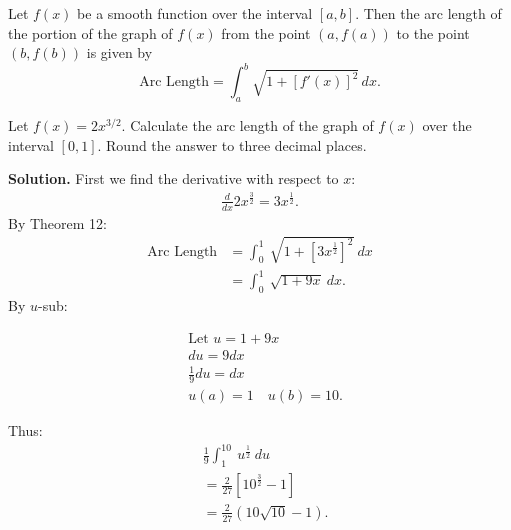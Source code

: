 \documentclass{report}
\begin{document}
    \bigbreak \noindent \bigbreak \noindent 
    \begin{thrm}[Arc length for $y=f(x)$]
        Let \(f(x)\) be a smooth function over the interval \([a,b]\). Then the arc length of the portion of the graph of \(f(x)\) from the point \((a,f(a))\) to the point \((b,f(b))\) is given by
        \[
        \text{Arc Length} = \int_a^b \sqrt{1 + [f'(x)]^2} \, dx.
        \]
    \end{thrm}
    \bigbreak \noindent \bigbreak \noindent 

    \pagebreak \bigbreak \noindent 
    \begin{eg}
        Let \( f(x) = 2x^{3/2} \). Calculate the arc length of the graph of \( f(x) \) over the interval \([0,1]\). Round the answer to three decimal places.
    \end{eg}
    \bigbreak \noindent 
    \textbf{Solution.} First we find the derivative with respect to $x$:
    \begin{align*}
        \frac{d}{dx}2x^{\frac{3}{2}} =3x^{\frac{1}{2}}
    .\end{align*}
    \bigbreak \noindent 
    By Theorem 12:
    \begin{align*}
        \text{Arc Length} &= \int_{0}^{1}\ \sqrt{1+[3x^{\frac{1}{2}}]^{2}}\ dx \\
          &=\int_{0}^{1}\ \sqrt{1+9x}\ dx 
    .\end{align*}
    \bigbreak \noindent 
    By $u$-sub:
    \bigbreak \noindent 
    \begin{minipage}[]{0.47\textwidth}
        \begin{align*}
            &\text{Let $u=1+9x$} \\
            &du = 9dx \\
            &\frac{1}{9}du = dx  \\
            &u(a) = 1 \quad u(b) = 10
        .\end{align*}
    \end{minipage}
    \begin{minipage}[]{0.47\textwidth}
        Thus:
        \begin{align*}
            &\frac{1}{9}\int_{1}^{10}\ u^{\frac{1}{2}}\ du \\
            &=\frac{2}{27}\left[10^{\frac{3}{2}}-1\right] \\
            &= \frac{2}{27}\left(10\sqrt{10}-1\right)
        .\end{align*}
    \end{minipage}
    \bigbreak \noindent 
    \bigbreak \noindent 
    \pagebreak 
\end{document}
